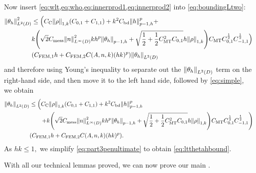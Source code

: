 Now insert \cref{eq:wlt,eq:who,eq:innerprod1,eq:innerprod2} into \cref{eq:boundingLtwo}:
\begin{align*}
\NLtD{\thetah}^2 &\leq \Big(\Cc \NW{\rho} \mleft(\Cfn{0,1} + \Cfn{1,1}\mright) + k^2 \Cfourteen \Nfn{p-1,h} h^p +\\
&k\mleft(\sqrt{2} \Cmess \NLiD{n}^2 kh^p \Nfn{p-1,h}{\thetah} + \sqrt{\half + \half\CMT^2 \Cfn{0,1}}h \NW{\rho}\mright)\CMT\Cfn{0,1}^{\half}\Cfn{-1,1}^{\half}\Big)\\
&\mleft(\CFEMotilde h + \CFEMttilde \CAnk (hk)^p\mright) \NLtD{\thetah}
\end{align*}
and therefore using Young's inequality to separate out the $\NLtD{\thetah}$ term on the right-hand side, and then move it to the left hand side, followed by \cref{eq:simple}, we obtain
\begin{align}\label{eq:part3penultimate}
\NLtD{\thetah} &\leq \mleft(\Cc \NW{\rho} \mleft(\Cfn{0,1} + \Cfn{1,1}\mright) + k^2 \Cfourteen \Nfn{p-1,h} h^p\mright.\\
&\quad\quad\mleft.+ k\mleft(\sqrt{2} \Cmess \NLiD{n}^2 kh^p \Nfn{p-1,h}{\thetah} + \sqrt{\half + \half\CMT^2 \Cfn{0,1}}h \NW{\rho}\mright)\CMT\Cfn{0,1}^{\half}\Cfn{-1,1}^{\half}\mright)\\& \mleft(\CFEMotilde h + \CFEMttilde \CAnk (hk)^p\mright).
\end{align}
As $hk \leq 1,$ we simplify \cref{eq:part3penultimate} to obtain \cref{eq:ltthetahbound}.
\epf

With all our technical lemmas proved, we can now prove our main .

